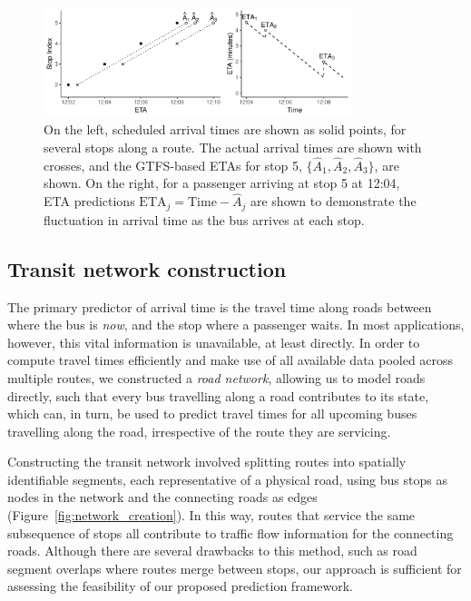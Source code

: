 \begin{figure}[tb]
    \centering
    \includegraphics[width=0.8\textwidth]{figures/02_gtfs_delays.pdf}
    \caption{
        On the left, scheduled arrival times are shown as solid points,
        for several stops along a route. The actual arrival times
        are shown with crosses,
        and the GTFS-based ETAs for stop 5, $\{\hat A_1, \hat A_2, \hat A_3\}$, are shown.
        On the right,
        for a passenger arriving at stop 5 at 12:04,
        ETA predictions
        $\mathrm{ETA}_j = \mathrm{Time} - \hat A_j$ are shown
        to demonstrate the fluctuation in
        arrival time as the bus arrives at each stop.
    }
    \label{fig:gtfs-delays}
\end{figure}



\subsection{Transit network construction}
\label{sec:network_build}

The primary predictor of arrival time is 
the travel time along roads between where the bus is \emph{now},
and the stop where a passenger waits.
In most applications, however, this vital information is unavailable, at least directly.
In order to compute travel times efficiently
and make use of all available data pooled across multiple routes,
we constructed a \emph{road network},
allowing us to model roads directly,
such that every bus travelling along a road contributes to its state,
which can, in turn, be used to predict travel times for all upcoming buses 
travelling along the road,
irrespective of the route they are servicing.


Constructing the transit network involved splitting routes
into spatially identifiable segments,
each representative of a physical road,
using bus stops as nodes in the network
and the connecting roads as edges
(Figure~\ref{fig:network_creation}).
In this way, routes that service the same subsequence of stops
all contribute to traffic flow information for the connecting roads.
Although there are several drawbacks to this method,
such as road segment overlaps where routes merge between stops,
our approach is sufficient for assessing the \rt 
feasibility of our proposed prediction framework.



